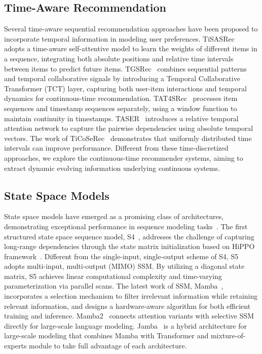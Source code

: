 \subsection{Time-Aware Recommendation}
Several time-aware sequential recommendation approaches have been proposed to incorporate temporal information in modeling user preferences. TiSASRec~\cite{li2020time} adopts a time-aware self-attentive model to learn the weights of different items in a sequence, integrating both absolute positions and relative time intervals between items to predict future items. TGSRec~\cite{TGSRec} combines sequential patterns and temporal collaborative signals by introducing a Temporal Collaborative Transformer (TCT) layer, capturing both user-item interactions and temporal dynamics for continuous-time recommendation. TAT4SRec~\cite{zhang2023time} processes item sequences and timestamp sequences separately, using a window function to maintain continuity in timestamps. TASER~\cite{ye2020time} introduces a relative temporal attention network to capture the pairwise dependencies using absolute temporal vectors. The work of TiCoSeRec~\cite{dang2023uniform} demonstrates that uniformly distributed time intervals can improve performance. Different from these time-discretized approaches, we explore the continuous-time recommender systems, aiming to extract dynamic evolving information underlying continuous systems.

\subsection{State Space Models}
State space models have emerged as a promising class of architectures, demonstrating exceptional performance in sequence modeling tasks~\cite{xu2024integrating}. The first structured state space sequence model, S4~\cite{gu2021efficiently}, addresses the challenge of capturing long-range dependencies through the state matrix initialization based on HiPPO framework~\cite{gu2020hippo}. Different from the single-input, single-output scheme of S4, S5~\cite{smith2022simplified} adopts multi-input, multi-output (MIMO) SSM. By utilizing a diagonal state matrix, S5 achieves linear computational complexity and time-varying parameterization via parallel scans. The latest work of SSM, Mamba~\cite{gu2023mamba}, incorporates a selection mechanism to filter irrelevant information while retaining relevant information, and designs a hardware-aware algorithm for both efficient training and inference. Mamba2~\cite{dao2024transformers} connects attention variants with selective SSM directly for large-scale language modeling. Jamba~\cite{lieber2024jamba} is a hybrid architecture for large-scale modeling that combines Mamba with Transformer and mixture-of-experts module to take full advantage of each architecture.

